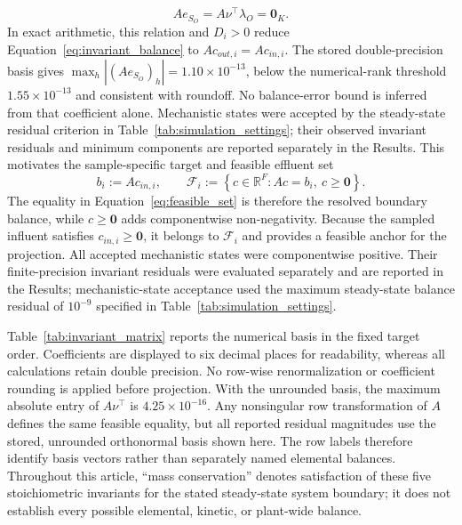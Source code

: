 \documentclass[a4paper,fleqn]{cas-sc}
\begin{document}
\begin{equation}
Ae_{S_O}=A\nu^\top\lambda_O=\mathbf{0}_K.
\end{equation}
In exact arithmetic, this relation and $D_i>0$ reduce Equation~\eqref{eq:invariant_balance} to $Ac_{out,i}=Ac_{in,i}$. The stored double-precision basis gives $\max_h|(Ae_{S_O})_h|=1.10\times10^{-13}$, below the numerical-rank threshold $1.55\times10^{-13}$ and consistent with roundoff. No balance-error bound is inferred from that coefficient alone. Mechanistic states were accepted by the steady-state residual criterion in Table~\ref{tab:simulation_settings}; their observed invariant residuals and minimum components are reported separately in the Results. This motivates the sample-specific target and feasible effluent set
\begin{equation}
\label{eq:feasible_set}
b_i:=A c_{in,i},\qquad
\mathcal{F}_i:=\left\{c\in\mathbb{R}^{F}:Ac=b_i,\ c\geq\mathbf{0}\right\}.
\end{equation}
The equality in Equation~\eqref{eq:feasible_set} is therefore the resolved boundary balance, while $c\geq\mathbf{0}$ adds componentwise non-negativity. Because the sampled influent satisfies $c_{in,i}\geq\mathbf{0}$, it belongs to $\mathcal{F}_i$ and provides a feasible anchor for the projection. All accepted mechanistic states were componentwise positive. Their finite-precision invariant residuals were evaluated separately and are reported in the Results; mechanistic-state acceptance used the maximum steady-state balance residual of $10^{-9}$ specified in Table~\ref{tab:simulation_settings}.

Table~\ref{tab:invariant_matrix} reports the numerical basis in the fixed target order. Coefficients are displayed to six decimal places for readability, whereas all calculations retain double precision. No row-wise renormalization or coefficient rounding is applied before projection. With the unrounded basis, the maximum absolute entry of $A\nu^\top$ is $4.25\times10^{-16}$. Any nonsingular row transformation of $A$ defines the same feasible equality, but all reported residual magnitudes use the stored, unrounded orthonormal basis shown here. The row labels therefore identify basis vectors rather than separately named elemental balances. Throughout this article, ``mass conservation'' denotes satisfaction of these five stoichiometric invariants for the stated steady-state system boundary; it does not establish every possible elemental, kinetic, or plant-wide balance.
\end{document}
